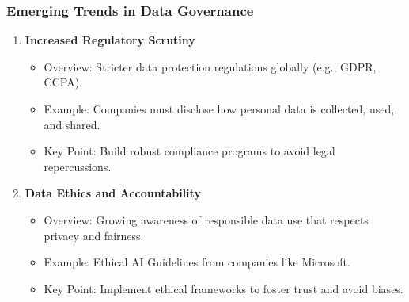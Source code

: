 \documentclass[aspectratio=169]{beamer}
\begin{document}
\begin{frame}[fragile]
    \frametitle{Emerging Trends in Data Governance}
    \begin{enumerate}
        \item \textbf{Increased Regulatory Scrutiny}
        \begin{itemize}
            \item Overview: Stricter data protection regulations globally (e.g., GDPR, CCPA).
            \item Example: Companies must disclose how personal data is collected, used, and shared.
            \item Key Point: Build robust compliance programs to avoid legal repercussions.
        \end{itemize}
        
        \item \textbf{Data Ethics and Accountability}
        \begin{itemize}
            \item Overview: Growing awareness of responsible data use that respects privacy and fairness.
            \item Example: Ethical AI Guidelines from companies like Microsoft. 
            \item Key Point: Implement ethical frameworks to foster trust and avoid biases.
        \end{itemize}
    \end{enumerate}
\end{frame}
\end{document}
